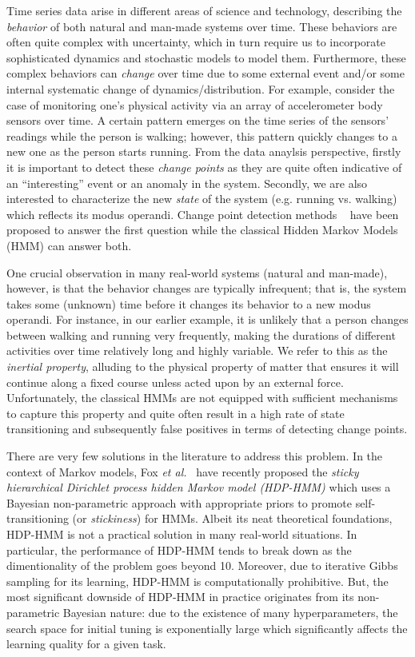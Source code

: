 Time series data arise in different areas of science and technology, describing
the \emph{behavior} of both natural and man-made systems over time. These
behaviors are often quite complex with uncertainty, which in turn require us to
incorporate sophisticated dynamics and stochastic models to model them.
Furthermore, these complex behaviors can \emph{change} over time due to some external event and/or some internal
systematic change of dynamics/distribution. For example, consider the case of
monitoring one's physical activity via an array of accelerometer body sensors
over time. A certain pattern emerges on the time series of the sensors' readings
while the person is walking; however, this pattern quickly changes to a new one
as the person starts running. From the data anaylsis perspective, firstly it is
important to detect these \emph{change points} as they are quite often
indicative of an ``interesting'' event or an anomaly in the system. Secondly, we
are also interested to characterize the new \emph{state} of the system (e.g. running vs.
walking) which reflects its modus operandi. Change point detection methods ~\cite{} have been proposed
to answer the first question while the classical Hidden Markov Models (HMM) can
answer both.

One crucial observation in many real-world systems (natural and man-made),
however, is that the behavior changes are typically infrequent; that is, the
system takes some (unknown) time before it changes its behavior to a new modus operandi. For
instance, in our earlier example, it is unlikely that a person changes between
walking and running very frequently, making the durations of different
activities over time relatively long and highly variable. We refer to this as the
\emph{inertial property}, alluding to the physical property of matter that
ensures it will continue along a fixed course unless acted upon by an external
force. Unfortunately, the classical HMMs are not equipped with sufficient
mechanisms to capture this property and quite often result in a high rate of
state transitioning and subsequently false positives in terms of detecting
change points.

There are very few solutions in the literature to address this problem. In
the context of Markov models, Fox \emph{et al.}~\cite{fox2011sticky} have
recently proposed the \emph{sticky hierarchical Dirichlet process hidden Markov
model (HDP-HMM)} which uses a Bayesian non-parametric approach with appropriate
priors to promote self-transitioning (or \emph{stickiness}) for HMMs. Albeit its
neat theoretical foundations, HDP-HMM is not a practical solution in many real-world situations.
In particular, the performance of HDP-HMM tends to break down as the
dimentionality of the problem goes beyond 10. Moreover, due to iterative Gibbs
sampling for its learning, HDP-HMM is computationally prohibitive. But, the
most significant downside of HDP-HMM in practice originates from its
non-parametric Bayesian nature: due to the existence of many hyperparameters,
the search space for initial tuning is exponentially large which significantly
affects the learning quality for a given task.

